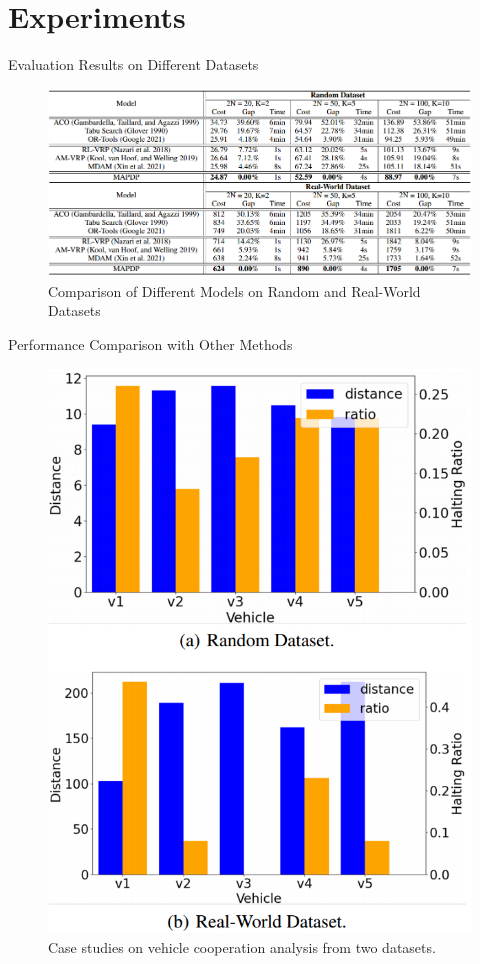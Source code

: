 \documentclass{beamer}
\begin{document}
\section{Experiments}

\begin{frame}{Evaluation Results on Different Datasets}
	\begin{figure}
		\centering
		\includegraphics[scale=0.3]{table1.png}
		\caption{Comparison of Different Models on Random and Real-World Datasets}
	\end{figure}
\end{frame}

\begin{frame}{Performance Comparison with Other Methods}
	\begin{figure}
		\centering
		\includegraphics[scale=0.2]{graph.png}
		\caption{ Case studies on vehicle cooperation analysis from two datasets.}
	\end{figure}
\end{frame}
\end{document}

